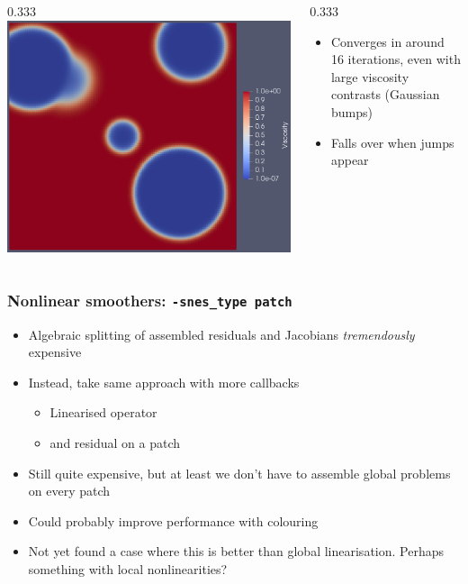 \documentclass[presentation,aspectratio=43,10pt]{beamer}
\begin{document}
\begin{frame}[fragile, t]
\begin{onlyenv}
\begin{columns}
\begin{column}{0.333\pagewidth}
        \includegraphics[width=\textwidth]{stokes-viscosity}
      \end{column}
      \begin{column}{0.333\pagewidth}
        \begin{itemize}
        \item Converges in around 16 iterations, even with large
          viscosity contrasts (Gaussian bumps)
        \item Falls over when jumps appear
        \end{itemize}
      \end{column}
    \end{columns}
  \end{onlyenv}
\end{frame}

\begin{frame}
  \frametitle{Nonlinear smoothers: \texttt{-snes\_type patch}}
  \begin{itemize}
  \item Algebraic splitting of assembled residuals and Jacobians
    \emph{tremendously} expensive
  \item Instead, take same approach with more callbacks
    \begin{itemize}
    \item Linearised operator
    \item and residual on a patch
    \end{itemize}
  \item Still quite expensive, but at least we don't have to assemble
    global problems on every patch
  \item Could probably improve performance with colouring
  \item Not yet found a case where this is better than global
    linearisation. Perhaps something with local nonlinearities?
  \end{itemize}
\end{frame}
\end{document}
